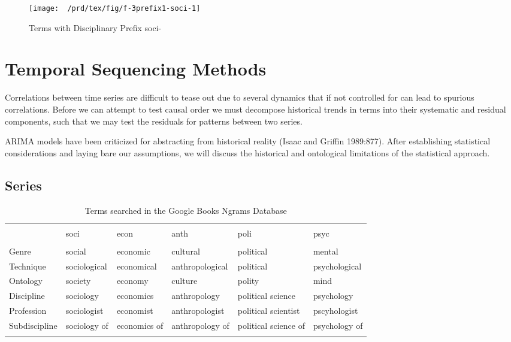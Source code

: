 \begin{figure}

{\centering \texttt{[image: ~/prd/tex/fig/f-3prefix1-soci-1]} 

}

\caption[Terms with Disciplinary Prefix soci-]{Terms with Disciplinary Prefix soci-}\label{fig:f-3prefix1-soci}
\end{figure}

\section{Temporal Sequencing Methods}\label{temporal-sequencing-methods}

Correlations between time series are difficult to tease out due to
several dynamics that if not controlled for can lead to spurious
correlations. Before we can attempt to test causal order we must
decompose historical trends in terms into their systematic and residual
components, such that we may test the residuals for patterns between two
series.

ARIMA models have been criticized for abstracting from historical
reality (Isaac and Griffin 1989:877). After establishing statistical
considerations and laying bare our assumptions, we will discuss the
historical and ontological limitations of the statistical approach.

\subsection{Series}\label{series}

\begin{kframe}

\begin{table}[!htbp] \centering 
  \caption{Terms searched in the Google Books Ngrams Database} 
  \label{query} 
\begin{tabular}{@{\extracolsep{5pt}} llllll} 
\\[-1.8ex]\hline 
\hline \\[-1.8ex] 
& soci & econ & anth & poli & psyc \\ 
\hline \\[-1.8ex] 
Genre & social & economic & cultural & political & mental \\ 
Technique & sociological & economical & anthropological & political & psychological \\ 
Ontology & society & economy & culture & polity & mind \\ 
Discipline & sociology & economics & anthropology & political science  & psychology \\ 
Profession & sociologist & economist & anthropologist & political scientist & pscyhologist \\ 
Subdiscipline & sociology of & economics of & anthropology of & political science of & psychology of \\ 
\hline \\[-1.8ex] 
\end{tabular} 
\end{table} 
\end{kframe}

